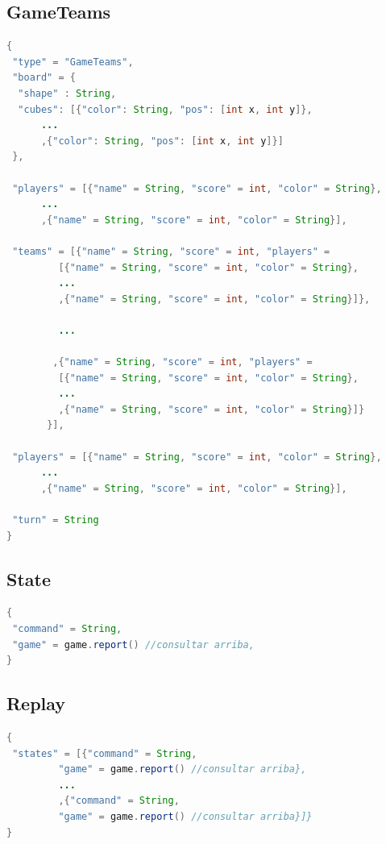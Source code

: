 \documentclass[12pt,a4paper,openright]{book}
\theoremstyle{break}
\begin{document}
\subsection*{GameTeams}
\begin{lstlisting}[frame=single, language=Java]
{
 "type" = "GameTeams",
 "board" = {
  "shape" : String,
  "cubes": [{"color": String, "pos": [int x, int y]},
  	  ...
  	  ,{"color": String, "pos": [int x, int y]}]
 },
 
 "players" = [{"name" = String, "score" = int, "color" = String},
 	  ...
 	  ,{"name" = String, "score" = int, "color" = String}],
 
 "teams" = [{"name" = String, "score" = int, "players" = 
 	     [{"name" = String, "score" = int, "color" = String},
 	     ...
 	     ,{"name" = String, "score" = int, "color" = String}]},
 	     
 	     ...
 	     
 	    ,{"name" = String, "score" = int, "players" = 
 	     [{"name" = String, "score" = int, "color" = String},
 	     ...
 	     ,{"name" = String, "score" = int, "color" = String}]}
	   }],
	   
 "players" = [{"name" = String, "score" = int, "color" = String},
 	  ...
 	  ,{"name" = String, "score" = int, "color" = String}],
 
 "turn" = String	
}
\end{lstlisting}

\newpage

\subsection*{State}
\begin{lstlisting}[frame=single, language=Java]
{
 "command" = String,
 "game" = game.report() //consultar arriba,
}
\end{lstlisting}

\subsection*{Replay}
\begin{lstlisting}[frame=single, language=Java]
{
 "states" = [{"command" = String,
 	     "game" = game.report() //consultar arriba},
 	     ...
 	     ,{"command" = String,
 	     "game" = game.report() //consultar arriba}]}
}
\end{lstlisting}
\end{document}
